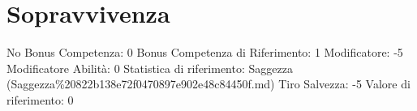\section{Sopravvivenza}\label{sopravvivenza}

\begin{description}
\tightlist
\item[Tags: ABI]
No Bonus Competenza: 0 Bonus Competenza di Riferimento: 1 Modificatore:
-5 Modificatore Abilità: 0 Statistica di riferimento: Saggezza
(Saggezza\%20822b138e72f0470897e902e48c84450f.md) Tiro Salvezza: -5
Valore di riferimento: 0
\end{description}
